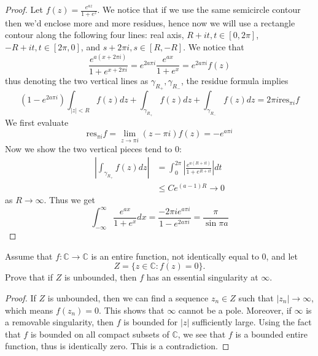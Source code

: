 \documentclass[openany]{book}
\newcommand{\C}{\mathbb{C}}
\begin{document}
\begin{proof}
    Let $f(z)=\frac{e^{az}}{1+e^z}$. We notice that if we use the same semicircle contour then we'd enclose more and more residues, hence now we will use a rectangle contour along the following four lines: real axis, $R+it, t\in[0,2\pi]$, $-R+it, t\in[2\pi, 0]$, and $s+2\pi i, s\in [R,-R]$. We notice that 
    \begin{equation*}
        \frac{e^{a(x+2\pi i)}}{1+e^{x+2\pi i}}=e^{2a\pi i}\frac{e^{ax}}{1+e^x}=e^{2a\pi i}f(z)
    \end{equation*}
    thus denoting the two vertical lines as $\gamma_{R_+}, \gamma_{R_-}$, the residue formula implies 
    \begin{equation*}
        \left(1-e^{2a\pi i}\right)\int_{|z|<R}f(z)dz+\int_{\gamma_{R_+}}f(z)dz+\int_{\gamma_{R_-}}f(z)dz=2\pi i\text{res}_{\pi i}f
    \end{equation*}
    We first evaluate 
    \begin{equation*}
        \text{res}_{\pi i}f=\lim_{z\to\pi i}(z-\pi i)f(z)=-e^{a\pi i}
    \end{equation*}
    Now we show the two vertical pieces tend to $0$:
    \begin{align*}
        \left|\int_{\gamma_{R_+}}f(z)dz\right|&=\int_0^{2\pi}\left|\frac{e^{a(R+it)}}{1+e^{R+it}}\right| dt\\
        &\leq Ce^{(a-1)R}\to 0
    \end{align*}
    as $R\to\infty$. Thus we get 
    \begin{equation*}
        \int_{-\infty}^\infty\frac{e^{ax}}{1+e^x}dx=\frac{-2\pi ie^{a\pi i}}{1-e^{2a\pi i}}=\frac{\pi}{\sin\pi a}
    \end{equation*}
\end{proof}



\begin{prob}
    Assume that $f:\mathbb{C}\to\mathbb{C}$ is an entire function, not identically equal to $0$, and let \[ Z=\{z\in\mathbb{C}:f(z)=0\}. \] Prove that if $Z$ is unbounded, then $f$ has an essential singularity at $\infty$.
\end{prob}

\begin{proof}
    If $Z$ is unbounded, then we can find a sequence $z_n\in Z$ such that $|z_n|\to\infty$, which means $f(z_n)=0$. This shows that $\infty$ cannot be a pole. Moreover, if $\infty$ is a removable singularity, then $f$ is bounded for $|z|$ sufficiently large. Using the fact that $f$ is bounded on all compact subsets of $\C$, we see that $f$ is a bounded entire function, thus is identically zero. This is a contradiction.
\end{proof}
\end{document}
